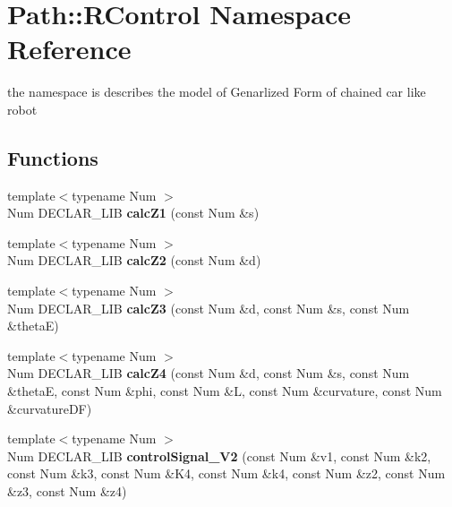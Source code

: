 \hypertarget{namespace_path_1_1_r_control}{}\section{Path\+:\+:R\+Control Namespace Reference}
\label{namespace_path_1_1_r_control}


the namespace is describes the model of Genarlized Form of chained car like robot  


\subsection*{Functions}
\begin{DoxyCompactItemize}
\item 
\mbox{\label{namespace_path_1_1_r_control_aed1a8a2610768324f64c8885e74b31ea}} 
{\footnotesize template$<$typename Num $>$ }\\Num D\+E\+C\+L\+A\+R\+\_\+\+L\+IB {\bfseries calc\+Z1} (const Num \&s)
\item 
\mbox{\label{namespace_path_1_1_r_control_a9c5d3dbe8dcff3ec69f468bd3a14f25e}} 
{\footnotesize template$<$typename Num $>$ }\\Num D\+E\+C\+L\+A\+R\+\_\+\+L\+IB {\bfseries calc\+Z2} (const Num \&d)
\item 
\mbox{\label{namespace_path_1_1_r_control_ae42a9cd1193fe31694dc236f27b265c1}} 
{\footnotesize template$<$typename Num $>$ }\\Num D\+E\+C\+L\+A\+R\+\_\+\+L\+IB {\bfseries calc\+Z3} (const Num \&d, const Num \&s, const Num \&thetaE)
\item 
\mbox{\label{namespace_path_1_1_r_control_aced4f7869f79063e2a7f0a4fc27795d0}} 
{\footnotesize template$<$typename Num $>$ }\\Num D\+E\+C\+L\+A\+R\+\_\+\+L\+IB {\bfseries calc\+Z4} (const Num \&d, const Num \&s, const Num \&thetaE, const Num \&phi, const Num \&L, const Num \&curvature, const Num \&curvature\+DF)
\item 
\mbox{\label{namespace_path_1_1_r_control_a2481f54f10def70ea47eaa513e26275c}} 
{\footnotesize template$<$typename Num $>$ }\\Num D\+E\+C\+L\+A\+R\+\_\+\+L\+IB {\bfseries control\+Signal\+\_\+\+V2} (const Num \&v1, const Num \&k2, const Num \&k3, const Num \&K4, const Num \&k4, const Num \&z2, const Num \&z3, const Num \&z4)

\end{DoxyCompactItemize}
